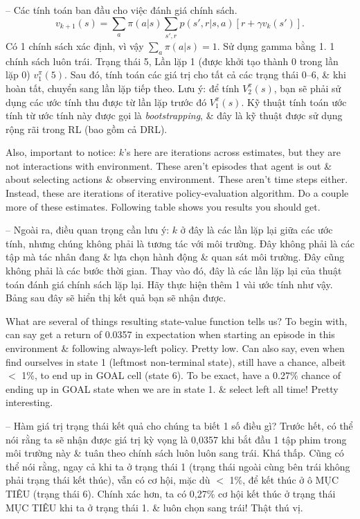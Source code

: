 \documentclass{article}
\begin{document}
\begin{itemize}
\begin{itemize}
\begin{itemize}
            -- {\sf Các tính toán ban đầu cho việc đánh giá chính sách.}
            \begin{equation*}
                v_{k+1}(s) = \sum_a \pi(a|s)\sum_{s',r} p(s',r|s,a)[r + \gamma v_k(s')].
            \end{equation*}
            Có 1 chính sách xác định, vì vậy $\sum_a \pi(a|s) = 1$. Sử dụng gamma bằng 1. 1 chính sách luôn trái. Trạng thái 5, Lần lặp 1 (được khởi tạo thành 0 trong lần lặp 0) $v_1^\pi(5)$. Sau đó, tính toán các giá trị cho tất cả các trạng thái 0--6, \& khi hoàn tất, chuyển sang lần lặp tiếp theo. Lưu ý: để tính $V_2^\pi(s)$, bạn sẽ phải sử dụng các ước tính thu được từ lần lặp trước đó $V_1^\pi(s)$. Kỹ thuật tính toán ước tính từ ước tính này được gọi là {\it bootstrapping}, \& đây là kỹ thuật được sử dụng rộng rãi trong RL (bao gồm cả DRL).

            Also, important to notice: $k$'s here are iterations across estimates, but they are not interactions with environment. These aren't episodes that agent is out \& about selecting actions \& observing environment. These aren't time steps either. Instead, these are iterations of iterative policy-evaluation algorithm. Do a couple more of these estimates. Following table shows you results you should get.

            -- Ngoài ra, điều quan trọng cần lưu ý: $k$ ở đây là các lần lặp lại giữa các ước tính, nhưng chúng không phải là tương tác với môi trường. Đây không phải là các tập mà tác nhân đang \& lựa chọn hành động \& quan sát môi trường. Đây cũng không phải là các bước thời gian. Thay vào đó, đây là các lần lặp lại của thuật toán đánh giá chính sách lặp lại. Hãy thực hiện thêm 1 vài ước tính như vậy. Bảng sau đây sẽ hiển thị kết quả bạn sẽ nhận được.

            What are several of things resulting state-value function tells us? To begin with, can say get a return of 0.0357 in expectation when starting an episode in this environment \& following always-left policy. Pretty low. Can also say, even when find ourselves in state 1 (leftmost non-terminal state), still have a chance, albeit $<$ 1\%, to end up in GOAL cell (state 6). To be exact, have a 0.27\% chance of ending up in GOAL state when we are in state 1. \& select left all time! Pretty interesting.

            -- Hàm giá trị trạng thái kết quả cho chúng ta biết 1 số điều gì? Trước hết, có thể nói rằng ta sẽ nhận được giá trị kỳ vọng là 0,0357 khi bắt đầu 1 tập phim trong môi trường này \& tuân theo chính sách luôn luôn sang trái. Khá thấp. Cũng có thể nói rằng, ngay cả khi ta ở trạng thái 1 (trạng thái ngoài cùng bên trái không phải trạng thái kết thúc), vẫn có cơ hội, mặc dù $<$ 1\%, để kết thúc ở ô MỤC TIÊU (trạng thái 6). Chính xác hơn, ta có 0,27\% cơ hội kết thúc ở trạng thái MỤC TIÊU khi ta ở trạng thái 1. \& luôn chọn sang trái! Thật thú vị.


\end{itemize}
\end{itemize}
\end{itemize}
\end{document}
